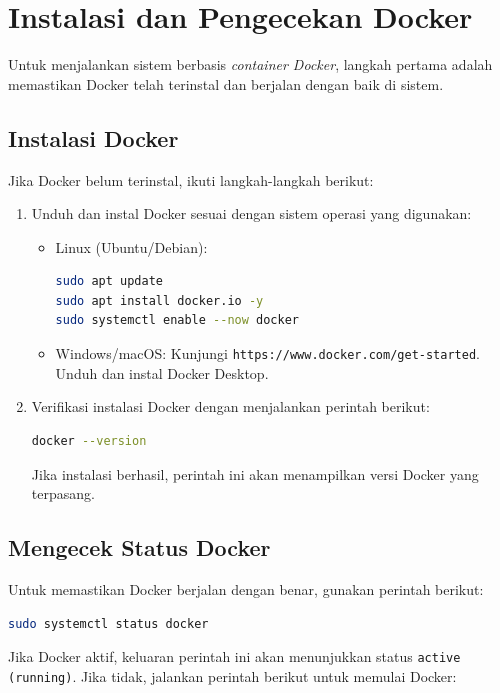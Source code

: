 \section{Instalasi dan Pengecekan Docker}

Untuk menjalankan sistem berbasis \textit{container Docker}, langkah pertama adalah memastikan Docker telah terinstal dan berjalan dengan baik di sistem.

\subsection{Instalasi Docker}

Jika Docker belum terinstal, ikuti langkah-langkah berikut:

\begin{enumerate}
\item Unduh dan instal Docker sesuai dengan sistem operasi yang digunakan:
\begin{itemize}
\item Linux (Ubuntu/Debian):
\begin{lstlisting}[language=bash]
sudo apt update
sudo apt install docker.io -y
sudo systemctl enable --now docker
\end{lstlisting}

\item Windows/macOS: Kunjungi \texttt{https://www.docker.com/get-started}. Unduh dan instal Docker Desktop.
\end{itemize}

\item Verifikasi instalasi Docker dengan menjalankan perintah berikut:
\begin{lstlisting}[language=bash]
docker --version
\end{lstlisting}
Jika instalasi berhasil, perintah ini akan menampilkan versi Docker yang terpasang.
\end{enumerate}

\subsection{Mengecek Status Docker}

Untuk memastikan Docker berjalan dengan benar, gunakan perintah berikut:

\begin{lstlisting}[language=bash]
sudo systemctl status docker
\end{lstlisting}

Jika Docker aktif, keluaran perintah ini akan menunjukkan status \texttt{active (running)}. Jika tidak, jalankan perintah berikut untuk memulai Docker:

